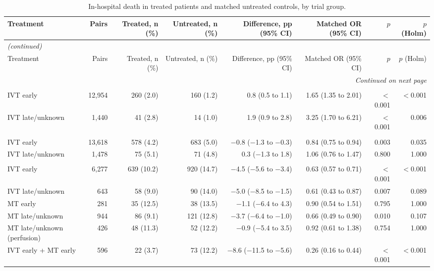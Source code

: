\begin{landscape}
\begin{longtable}{p{5.6cm}rrrrrrr}
\caption{In-hospital death in treated patients and matched untreated controls, by trial group.}\label{tab:supp_death}\\
\toprule
Treatment & Pairs & Treated, n (\%) & Untreated, n (\%) & Difference, pp (95\% CI) & Matched OR (95\% CI) & $p$ & $p$ (Holm) \\
\midrule
\endfirsthead
\multicolumn{8}{l}{\textit{(continued)}}\\
\toprule
Treatment & Pairs & Treated, n (\%) & Untreated, n (\%) & Difference, pp (95\% CI) & Matched OR (95\% CI) & $p$ & $p$ (Holm) \\
\midrule
\endhead
\midrule
\multicolumn{8}{r}{\textit{Continued on next page}}\\
\endfoot
\bottomrule
\endlastfoot
\multicolumn{8}{l}{\textbf{NIHSS 1--5}}\\
IVT early & 12,954 & 260 (2.0) & 160 (1.2) & 0.8 (0.5 to 1.1) & 1.65 (1.35 to 2.01) & $<$0.001 & $<$0.001 \\
IVT late/unknown & 1,440 & 41 (2.8) & 14 (1.0) & 1.9 (0.9 to 2.8) & 3.25 (1.70 to 6.21) & $<$0.001 & 0.006 \\
\addlinespace
\multicolumn{8}{l}{\textbf{NIHSS 6--10}}\\
IVT early & 13,618 & 578 (4.2) & 683 (5.0) & $-$0.8 ($-$1.3 to $-$0.3) & 0.84 (0.75 to 0.94) & 0.003 & 0.035 \\
IVT late/unknown & 1,478 & 75 (5.1) & 71 (4.8) & 0.3 ($-$1.3 to 1.8) & 1.06 (0.76 to 1.47) & 0.800 & 1.000 \\
\addlinespace
\multicolumn{8}{l}{\textbf{NIHSS 11--15}}\\
IVT early & 6,277 & 639 (10.2) & 920 (14.7) & $-$4.5 ($-$5.6 to $-$3.4) & 0.63 (0.57 to 0.71) & $<$0.001 & $<$0.001 \\
IVT late/unknown & 643 & 58 (9.0) & 90 (14.0) & $-$5.0 ($-$8.5 to $-$1.5) & 0.61 (0.43 to 0.87) & 0.007 & 0.089 \\
MT early & 281 & 35 (12.5) & 38 (13.5) & $-$1.1 ($-$6.4 to 4.3) & 0.90 (0.54 to 1.51) & 0.795 & 1.000 \\
MT late/unknown & 944 & 86 (9.1) & 121 (12.8) & $-$3.7 ($-$6.4 to $-$1.0) & 0.66 (0.49 to 0.90) & 0.010 & 0.107 \\
MT late/unknown (perfusion) & 426 & 48 (11.3) & 52 (12.2) & $-$0.9 ($-$5.4 to 3.5) & 0.92 (0.61 to 1.38) & 0.754 & 1.000 \\
IVT early + MT early & 596 & 22 (3.7) & 73 (12.2) & $-$8.6 ($-$11.5 to $-$5.6) & 0.26 (0.16 to 0.44) & $<$0.001 & $<$0.001 \\

\end{longtable}
\end{landscape}
